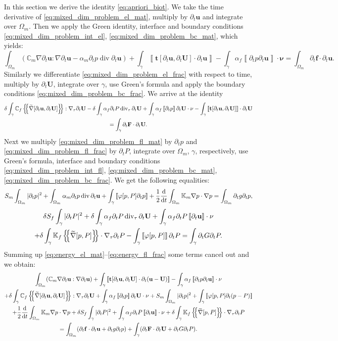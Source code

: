 \documentclass[a4paper]{m2an}
\numberwithin{equation}{section}
\def\agrad{\widetilde\nabla}
\def\avg#1{\left\{\mskip-5mu\left\{#1\right\}\mskip-5mu\right\}}
\def\CC{\tn C}
\def\ddt#1{\xdrv{#1}{t}}
\def\div{\operatorname{div}}
\def\dt{\prtl_t}
\def\FF{\vc F}
\def\ff{\vc f}
\def\jmp#1{\left\llbracket #1 \right\rrbracket}
\def\nnu{\vc\nu}
\def\prtl{\partial}
\def\tn#1{{\mathbb{#1}}}    %
\def\ttraction{\vc t}
\def\U{\vc U}
\def\uu{\vc u}
\def\vc#1{\mathbf{#1}}     %
\newcommand{\eq}[1]{\begin{equation}#1\end{equation}}
\newcommand{\ml}[1]{\begin{multline}#1\end{multline}}
\begin{document}
In this section we derive the identity \eqref{eq:apriori_biot}.
We take the time derivative of \eqref{eq:mixed_dim_problem_el_mat}, multiply by $\dt\uu$ and integrate over $\Omega_m$.
Then we apply the Green identity, interface and boundary conditions \eqref{eq:mixed_dim_problem_int_el}, \eqref{eq:mixed_dim_problem_bc_mat}, which yields:
\eq{ \label{eq:energy_el_mat} \int_{\Omega_m}(\CC_m\nabla\dt\uu:\nabla\dt\uu - \alpha_m\dt p \div\dt\uu) + \int_\gamma\jmp{\ttraction[\dt\uu,\dt\U]\cdot\dt\uu}
- \int_\gamma\alpha_f\jmp{\dt p \dt\uu}\cdot\nnu
= \int_{\Omega_m}\dt\ff\cdot\dt\uu. }
Similarly we differentiate \eqref{eq:mixed_dim_problem_el_frac} with respect to time, multiply by $\dt\U$, integrate over $\gamma$, use Green's formula and apply the boundary conditions \eqref{eq:mixed_dim_problem_bc_frac}.
We arrive at the identity
\ml{ \label{eq:energy_el_frac} \delta\int_\gamma\CC_f\avg{\agrad[\dt\uu,\dt\U]}:\nabla_\tau\dt\U - \delta\int_\gamma\alpha_f\dt P\div_\tau\dt\U
+ \int_\gamma\alpha_f\jmp{\dt p}\dt\U\cdot\nnu - \int_\gamma\jmp{\ttraction[\dt\uu,\dt\U]}\cdot\dt\U\\
= \int_\gamma\dt\FF\cdot\dt\U. }
Next we multiply \eqref{eq:mixed_dim_problem_fl_mat} by $\dt p$ and \eqref{eq:mixed_dim_problem_fl_frac} by $\dt P$, integrate over $\Omega_m$, $\gamma$, respectively, use Green's formula, interface and boundary conditions \eqref{eq:mixed_dim_problem_int_fl}, \eqref{eq:mixed_dim_problem_bc_mat}, \eqref{eq:mixed_dim_problem_bc_frac}.
We get the following equalities:
\eq{ \label{eq:energy_fl_mat} S_m\int_{\Omega_m}|\dt p|^2 + \int_{\Omega_m}\alpha_m\dt p\div\dt\uu + \int_\gamma\jmp{\varphi[p,P]\dt p}
+ \frac12\ddt{}\int_{\Omega_m}\tn K_m\nabla p\cdot\nabla p
= \int_{\Omega_m}\dt g \dt p, }
\ml{ \label{eq:energy_fl_frac} \delta S_f\int_\gamma|\dt P|^2 + \delta\int_\gamma\alpha_f\dt P\div_\tau\dt\U + \int_\gamma\alpha_f\dt P\jmp{\dt\uu}\cdot\nnu\\
+ \delta\int_\gamma\tn K_f\avg{\agrad[p,P]}\cdot\nabla_\tau\dt P 
- \int_\gamma\jmp{\varphi[p,P]}\dt P = \int_\gamma \dt G \dt P. }
Summing up \eqref{eq:energy_el_mat}--\eqref{eq:energy_fl_frac} some terms cancel out and we obtain:
\ml{ \label{eq:energy_sum} \int_{\Omega_m}(\CC_m\nabla\dt\uu:\nabla\dt\uu ) + \int_\gamma\jmp{\ttraction[\dt\uu,\dt\U]\cdot\dt(\uu-\U)}
- \int_\gamma\alpha_f\jmp{\dt p \dt\uu}\cdot\nnu\\
+ \delta\int_\gamma\CC_f\avg{\agrad[\dt\uu,\dt\U]}:\nabla_\tau\dt\U
+ \int_\gamma\alpha_f\jmp{\dt p}\dt\U\cdot\nnu
+ S_m\int_{\Omega_m}|\dt p|^2 + \int_\gamma\jmp{\varphi[p,P]\dt(p-P)}\\
+ \frac12\ddt{}\int_{\Omega_m}\tn K_m\nabla p\cdot\nabla p
+ \delta S_f\int_\gamma|\dt P|^2 + \int_\gamma\alpha_f\dt P\jmp{\dt\uu}\cdot\nnu
+ \delta\int_\gamma\tn K_f\avg{\agrad[p,P]}\cdot\nabla_\tau\dt P \\
= \int_{\Omega_m}(\dt\ff\cdot\dt\uu + \dt g \dt p) + \int_\gamma(\dt\FF\cdot\dt\U + \dt G \dt P). }
\end{document}
